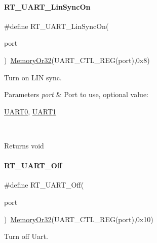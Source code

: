 \paragraph{\texorpdfstring{R\+T\+\_\+\+U\+A\+R\+T\+\_\+\+Lin\+Sync\+On}{RT\_UART\_LinSyncOn}}
{\footnotesize\ttfamily \#define R\+T\+\_\+\+U\+A\+R\+T\+\_\+\+Lin\+Sync\+On(\begin{DoxyParamCaption}\item[{}]{port }\end{DoxyParamCaption})~\mbox{\hyperlink{a00068_a27874a97deab7cecdde5ddecf466e31e}{Memory\+Or32}}(U\+A\+R\+T\+\_\+\+C\+T\+L\+\_\+\+R\+EG(port),0x8)}



Turn on L\+IN sync. 


\begin{DoxyParams}{Parameters}
{\em port} & Port to use, optional value\+:
\begin{DoxyCode}
\mbox{\hyperlink{a00173_a0508661f121639ffdee7de2353a0def2}{UART0}}, \mbox{\hyperlink{a00173_a8d69bf04d07af4fbbab5a8bd291f65ff}{UART1}}
\end{DoxyCode}
 \\
\hline
\end{DoxyParams}
\begin{DoxyReturn}{Returns}
void 
\end{DoxyReturn}
\mbox{\label{a00173_a60de547d761052a56b69e4a75493b831}} 
\paragraph{\texorpdfstring{R\+T\+\_\+\+U\+A\+R\+T\+\_\+\+Off}{RT\_UART\_Off}}
{\footnotesize\ttfamily \#define R\+T\+\_\+\+U\+A\+R\+T\+\_\+\+Off(\begin{DoxyParamCaption}\item[{}]{port }\end{DoxyParamCaption})~\mbox{\hyperlink{a00068_a27874a97deab7cecdde5ddecf466e31e}{Memory\+Or32}}(U\+A\+R\+T\+\_\+\+C\+T\+L\+\_\+\+R\+EG(port),0x10)}



Turn off Uart. 


